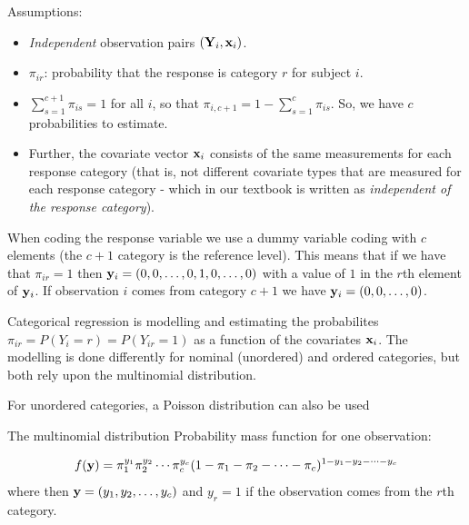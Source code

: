 \documentclass[
  ignorenonframetext,
]{beamer}
\providecommand{\tightlist}{%
  \setlength{\itemsep}{0pt}\setlength{\parskip}{0pt}}
\begin{document}
\begin{frame}
Assumptions:

\begin{itemize}
\tightlist
\item
  \emph{Independent} observation pairs \(({\bf Y}_i,{\bf x}_i)\).
\item
  \(\pi_{ir}\): probability that the response is category \(r\) for
  subject \(i\).
\item
  \(\sum_{s=1}^{c+1}\pi_{is}=1\) for all \(i\), so that
  \(\pi_{i,c+1}=1-\sum_{s=1}^{c}\pi_{is}\). So, we have \(c\)
  probabilities to estimate.
\item
  Further, the covariate vector \({\bf x}_i\) consists of the same
  measurements for each response category (that is, not different
  covariate types that are measured for each response category - which
  in our textbook is written as \emph{independent of the response
  category}).
\end{itemize}
\end{frame}

\begin{frame}
When coding the response variable we use a dummy variable coding with
\(c\) elements (the \(c+1\) category is the reference level). This means
that if we have that \(\pi_{ir}=1\) then
\({\bf y}_i=(0,0,\ldots,0,1,0,\ldots,0)\) with a value of \(1\) in the
\(r\)th element of \({\bf y}_i\). If observation \(i\) comes from
category \(c+1\) we have \({\bf y}_i=(0,0,\ldots,0)\).
\end{frame}

\begin{frame}
\begin{block}{Categorical regression}
\protect\hypertarget{categorical-regression}{}
is modelling and estimating the probabilites
\(\pi_{ir}=P(Y_i=r)=P(Y_{ir}=1)\) as a function of the covariates
\({\bf x}_i\). The modelling is done differently for nominal (unordered)
and ordered categories, but both rely upon the multinomial distribution.

For unordered categories, a Poisson distribution can also be used
\end{block}
\end{frame}

\begin{frame}
\begin{block}{The multinomial distribution}
\protect\hypertarget{the-multinomial-distribution}{}
Probability mass function for one observation:

\[f({\bf y})=\pi_1^{y_{1}} \pi_2^{y_{2}} \cdots \pi_c^{y_c} (1-\pi_1-\pi_2-\cdots-\pi_c)^{1-y_1-y_2-\cdots-y_c}\]
where then \({\bf y}=(y_1,y_2,\ldots,y_c)\) and \(y_r=1\) if the
observation comes from the \(r\)th category.
\end{block}
\end{frame}
\end{document}
